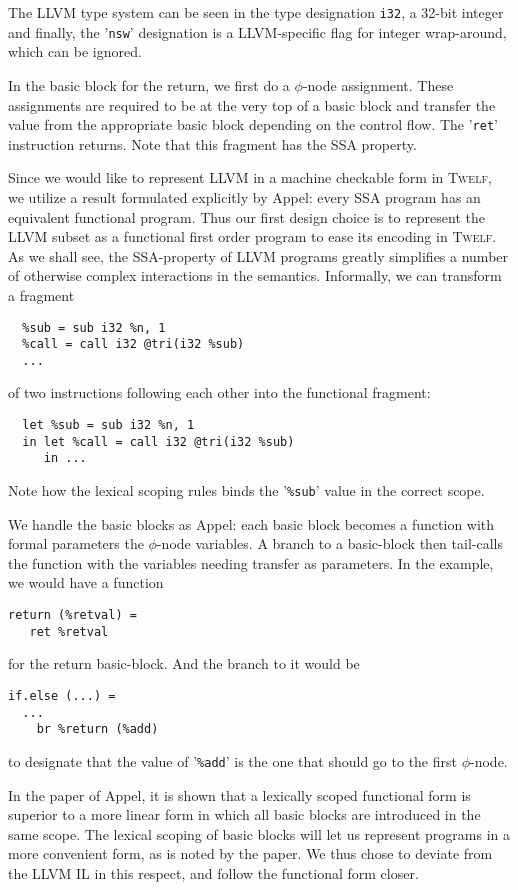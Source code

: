 \documentclass[a4paper, oneside, 10pt, final]{memoir}
\newcommand{\twelf}{\textsc{Twelf}}
\begin{document}
The LLVM type system can be seen in the type designation \texttt{i32},
a 32-bit integer and finally, the '\texttt{nsw}' designation is a
LLVM-specific flag for integer wrap-around, which can be ignored.

In the basic block for the return, we first do a $\phi$-node
assignment. These assignments are required to be at the very top of a
basic block and transfer the value from the appropriate basic block
depending on the control flow. The '\texttt{ret}' instruction
returns. Note that this fragment has the SSA property.

Since we would like to represent LLVM in a machine checkable form in
\twelf{}, we utilize a result formulated explicitly by
Appel\cite{appel:1998:modern, appel:1998:ssa}: every SSA program has
an equivalent functional program. Thus our first design choice is to
represent the LLVM subset as a functional first order program to ease
its encoding in \twelf{}. As we shall see, the SSA-property of LLVM
programs greatly simplifies a number of otherwise complex interactions
in the semantics. Informally, we can transform a fragment
\label{llvm-consideration-let}
\begin{verbatim}
  %sub = sub i32 %n, 1
  %call = call i32 @tri(i32 %sub)
  ...
\end{verbatim}
of two instructions following each other into the functional fragment:
\begin{verbatim}
  let %sub = sub i32 %n, 1
  in let %call = call i32 @tri(i32 %sub)
     in ...
\end{verbatim}

Note how the lexical scoping rules binds the '\texttt{\%sub}' value
in the correct scope.

We handle the basic blocks as Appel: each basic block becomes a
function with formal parameters the $\phi$-node variables. A branch to
a basic-block then tail-calls the function with the variables needing
transfer as parameters. In the example, we would have a function
\begin{verbatim}
return (%retval) =
   ret %retval
\end{verbatim}
for the return basic-block. And the branch to it would be
\begin{verbatim}
if.else (...) =
  ...
    br %return (%add)
\end{verbatim}
to designate that the value of '\texttt{\%add}' is the one that should
go to the first $\phi$-node.

In the paper of Appel\cite{appel:1998:ssa}, it is shown that a
lexically scoped functional form is superior to a more linear form in
which all basic blocks are introduced in the same scope. The lexical
scoping of basic blocks will let us represent programs in a more
convenient form, as is noted by the paper. We thus chose to deviate
from the LLVM IL in this respect, and follow the functional form closer.
\end{document}
